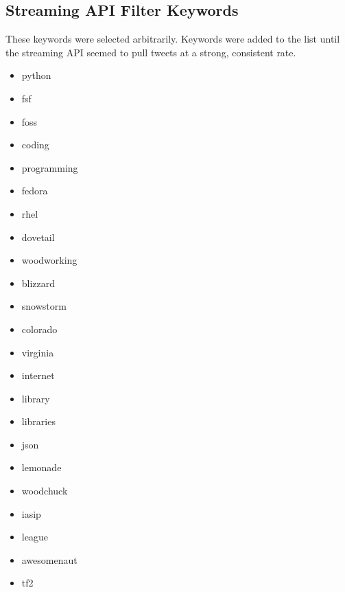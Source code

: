 \documentclass[a4paper,12pt]{article}
\begin{document}
\clearpage
\begin{appendices}

\section{Streaming API Filter Keywords}
These keywords were selected arbitrarily. Keywords were added to the list until the streaming
API seemed to pull tweets at a strong, consistent rate.
\begin{multicols}{3}
\begin{itemize}
    \item python
    \item fsf
    \item foss
    \item coding
    \item programming
    \item fedora
    \item rhel
    \item dovetail
    \item woodworking
    \item blizzard
    \item snowstorm
    \item colorado
    \item virginia
    \item internet
    \item library
    \item libraries
    \item json
    \item lemonade
    \item woodchuck
    \item iasip
    \item league
    \item awesomenaut
    \item tf2
\end{itemize}
\end{multicols}

\end{appendices}






\end{document}
